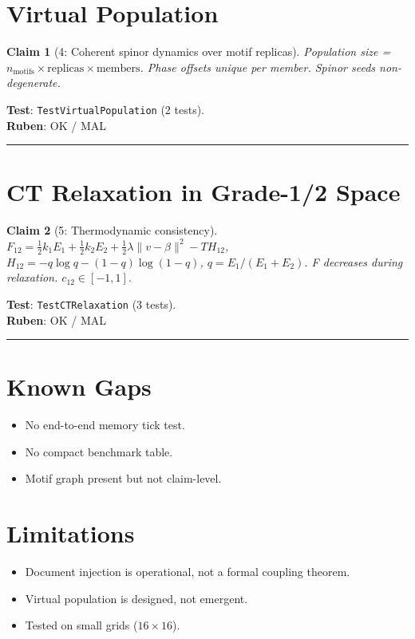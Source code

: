 \documentclass[11pt,a4paper]{article}
\newtheorem{claim}{Claim}
\begin{document}
\section{Virtual Population}
\begin{claim}[4: Coherent spinor dynamics over motif replicas]
Population size = $n_{\mathrm{motifs}} \times \mathrm{replicas} \times \mathrm{members}$.
Phase offsets unique per member. Spinor seeds non-degenerate.
\end{claim}
\noindent\textbf{Test}: \texttt{TestVirtualPopulation} (2 tests).\\[4pt]
\textbf{Ruben}: OK / MAL \rule{3cm}{0.4pt}

\section{CT Relaxation in Grade-1/2 Space}
\begin{claim}[5: Thermodynamic consistency]
$F_{12} = \tfrac{1}{2}k_1 E_1 + \tfrac{1}{2}k_2 E_2 + \tfrac{1}{2}\lambda\|v-\beta\|^2 - T H_{12}$,
$H_{12} = -q\log q - (1-q)\log(1-q)$, $q = E_1/(E_1+E_2)$.
F decreases during relaxation. $c_{12} \in [-1,1]$.
\end{claim}
\noindent\textbf{Test}: \texttt{TestCTRelaxation} (3 tests).\\[4pt]
\textbf{Ruben}: OK / MAL \rule{3cm}{0.4pt}

\section{Known Gaps}
\begin{itemize}
  \item No end-to-end memory tick test.
  \item No compact benchmark table.
  \item Motif graph present but not claim-level.
\end{itemize}

\section{Limitations}
\begin{itemize}
  \item Document injection is operational, not a formal coupling theorem.
  \item Virtual population is designed, not emergent.
  \item Tested on small grids ($16\times16$).
\end{itemize}



\end{document}
